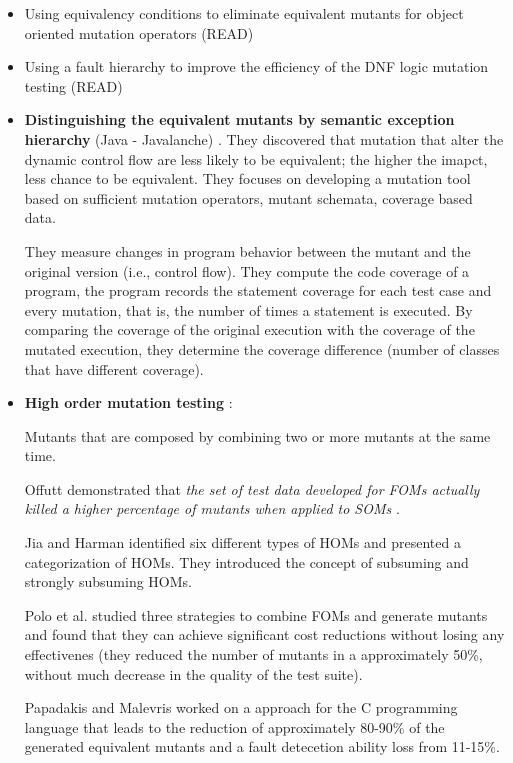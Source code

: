 \begin{itemize}
	\item Using equivalency conditions to eliminate equivalent mutants for object oriented mutation operators \cite{offutt2006class} (READ)

	\item Using a fault hierarchy to improve the efficiency of the DNF logic mutation testing \cite{kaminski2009using} (READ)

	\item \textbf{Distinguishing the equivalent mutants by semantic exception hierarchy} (Java - Javalanche) \cite{grun2009impact}. They discovered that mutation that alter the dynamic control flow are less likely to be equivalent; the higher the imapct, less chance to be equivalent. They focuses on developing a mutation tool based on sufficient mutation operators, mutant schemata, coverage based data.

	They measure changes in program behavior between the mutant and the original version (i.e., control flow). They compute the code coverage of a program, the program records the statement coverage for each test case and every mutation, that is, the number of times a statement is executed.
	By comparing the coverage of the original execution with the coverage of the mutated execution, they determine the coverage difference (number of classes that have different coverage). 

	\item \textbf{High order mutation testing} \cite{jia2009higher,kintis2010evaluating,offutt1992investigations,papadakis2010empirical}:
	
	Mutants that are composed by combining two or more mutants at the same time. 

	Offutt demonstrated that \textit{the set of test data developed for FOMs actually killed a higher percentage of mutants when applied to SOMs} \cite{offutt1992investigations}.

	Jia and Harman identified six different types of HOMs \cite{jia2009higher} and presented a categorization of HOMs. They introduced the concept of subsuming and strongly subsuming HOMs.

	Polo et al. \cite{polo2009decreasing} studied three strategies to combine FOMs and generate mutants and found that they can achieve significant cost reductions without losing any effectivenes (they reduced the number of mutants in a approximately 50\%, without much decrease in the quality of the test suite).

	Papadakis and Malevris \cite{papadakis2010empirical} worked on a approach for the C programming language that leads to the reduction of approximately 80-90\% of the generated equivalent mutants and a fault detecetion ability loss from 11-15\%. 


\end{itemize}
